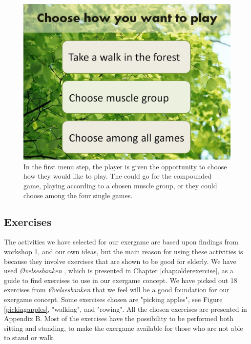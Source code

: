 \begin{figure} [H]
\centering
\includegraphics[scale=0.45]{choosePlay.jpg}
\caption[The menu - start]{In the first menu step, the player is given the opportunity to choose how they would like to play. The could go for the compounded game, playing according to a chosen muscle group, or they could choose among the four single games.}
\label{fig:menuStart}
\end{figure} 

\subsection{Exercises}
The activities we have selected for our exergame are based upon findings from workshop 1, and our own ideas, but the main reason for using these activities is because they involve exercises that are shown to be good for elderly. We have used \emph{Øvelsesbanken} \cite{eldretrening}, which is presented in Chapter \ref{chap:olderexercise}, as a guide to find exercises to use in our exergame concept. We have picked out 18 exercises from \emph{Øvelsesbanken} that we feel will be a good foundation for our exergame concept. Some exercises chosen are "picking apples", see Figure \ref{pickingapples}, "walking", and "rowing". All the chosen exercises are presented in Appendix B. Most of the exercises have the possibility to be performed both sitting and standing, to make the exergame available for those who are not able to stand or walk.


